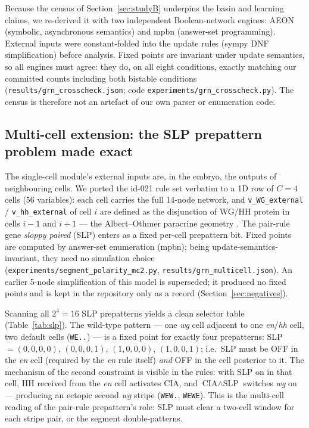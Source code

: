 Because the census of Section~\ref{sec:studyB} underpins the basin and
learning claims, we re-derived it with two independent Boolean-network
engines: AEON (symbolic, asynchronous semantics) and mpbn (answer-set
programming). External inputs were constant-folded into the update rules
(sympy DNF simplification) before analysis. Fixed points are invariant under
update semantics, so all engines must agree: they do, on all eight
conditions, exactly matching our committed counts including both bistable
conditions (\texttt{results/grn\_crosscheck.json}; code
\texttt{experiments/grn\_crosscheck.py}). The census is therefore not an
artefact of our own parser or enumeration code.

\subsection{Multi-cell extension: the SLP prepattern problem made exact}
\label{sec:multicell}

The single-cell module's external inputs are, in the embryo, the outputs of
neighbouring cells. We ported the id-021 rule set verbatim to a 1D row of
$C = 4$ cells (56 variables): each cell carries the full 14-node network, and
\texttt{v\_WG\_external} / \texttt{v\_hh\_external} of cell $i$ are defined as
the disjunction of WG/HH protein in cells $i-1$ and $i+1$ --- the
Albert--Othmer paracrine geometry \cite{albert2003}. The pair-rule gene
\emph{sloppy paired} (SLP) enters as a fixed per-cell prepattern bit. Fixed
points are computed by answer-set enumeration (mpbn); being
update-semantics-invariant, they need no simulation choice
(\texttt{experiments/segment\_polarity\_mc2.py},
\texttt{results/grn\_multicell.json}). An earlier 5-node simplification of
this model is superseded; it produced no fixed points and is kept in the
repository only as a record (Section~\ref{sec:negatives}).

Scanning all $2^4 = 16$ SLP prepatterns yields a clean selector table
(Table~\ref{tab:slp}). The wild-type pattern --- one \emph{wg} cell adjacent
to one \emph{en}/\emph{hh} cell, two default cells (\texttt{WE..}) --- is a
fixed point for exactly four prepatterns: SLP $= (0,0,0,0)$, $(0,0,0,1)$,
$(1,0,0,0)$, $(1,0,0,1)$; i.e.\ SLP must be OFF in the \emph{en} cell
(required by the \emph{en} rule itself) \emph{and} OFF in the cell posterior
to it. The mechanism of the second constraint is visible in the rules: with
SLP on in that cell, HH received from the \emph{en} cell activates CIA, and
$\text{CIA} \wedge \text{SLP}$ switches \emph{wg} on --- producing an ectopic
second \emph{wg} stripe (\texttt{WEW.}, \texttt{WEWE}). This is the
multi-cell reading of the pair-rule prepattern's role: SLP must clear a
two-cell window for each stripe pair, or the segment double-patterns.

